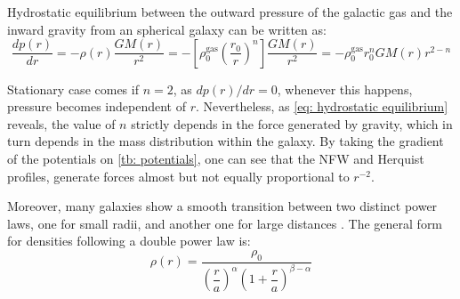 		Hydrostatic equilibrium between the outward pressure of the galactic gas and the inward gravity from an spherical galaxy can be written as:
		\begin{equation}\label{eq: hydrostatic equilibrium}
			\dfrac{dp(r)}{dr} = -\rho(r)\dfrac{GM(r)}{r^2} = -\left[\rho_0^\text{gas}\left(\dfrac{r_0}{r}\right)^n\right]\dfrac{GM(r)}{r^2} = -\rho_0^\text{gas}r_0^nGM(r)r^{2-n}
		\end{equation}
		
		Stationary case comes if $n = 2$, as $dp(r) / dr = 0$, whenever this happens, pressure becomes independent of $r$. Nevertheless, as \autoref{eq: hydrostatic equilibrium} reveals, the value of $n$ strictly depends in the force generated by gravity, which in turn depends in the mass distribution within the galaxy. By taking the gradient of the potentials on \autoref{tb: potentials}, one can see that the NFW and Herquist profiles, generate forces almost but not equally proportional to $r^{-2}$.
		
		Moreover, many galaxies show a smooth transition between two distinct power laws, one for small radii, and another one for large distances \cite{binney2011galactic}. The general form for densities following a double power law is:
		\begin{equation}
			\rho(r) = \dfrac{\rho_0}{\left(\dfrac{r}{a}\right) ^ \alpha \left(1 + \dfrac{r}{a}\right) ^ {\beta - \alpha}}
		\end{equation}
		
